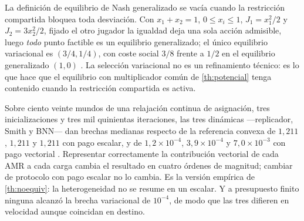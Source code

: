\begin{observacion}
\label{obs:gne-ineficiente}
La definición de equilibrio de Nash generalizado se vacía cuando la
restricción compartida bloquea toda desviación. Con $x_1+x_2=1$,
$0\le x_i\le1$, $J_1=x_1^2/2$ y $J_2=3x_2^2/2$, fijado el otro jugador la
igualdad deja una sola acción admisible, luego \emph{todo} punto factible es
un equilibrio generalizado; el único equilibrio variacional es $(3/4,1/4)$,
con coste social $3/8$ frente a $1/2$ en el equilibrio generalizado $(1,0)$
\cite{mayorga2026compendio}. La selección variacional no es un refinamiento
técnico: es lo que hace que el equilibrio con multiplicador común de
\cref{th:potencial} tenga contenido cuando la restricción compartida es
activa.
\end{observacion}

\begin{observacion}
\label{obs:pago-vectorial}
Sobre ciento veinte mundos de una relajación continua de asignación, tres
inicializaciones y tres mil quinientas iteraciones, las tres dinámicas
—replicador, Smith y BNN— dan brechas medianas respecto de la referencia
convexa de $1{,}211$, $1{,}211$ y $1{,}211$ con pago escalar, y de
$1{,}2\times10^{-4}$, $3{,}9\times10^{-4}$ y $7{,}0\times10^{-3}$ con pago
vectorial \cite{mayorga2026compendio}. Representar correctamente la
contribución vectorial de cada AMR a cada carga cambia el resultado en cuatro
órdenes de magnitud; cambiar de protocolo con pago escalar no lo cambia. Es
la versión empírica de \cref{th:noequiv}: la heterogeneidad no se resume en
un escalar. Y a presupuesto finito ninguna alcanzó la brecha variacional de
$10^{-4}$, de modo que las tres difieren en velocidad aunque coincidan en
destino.
\end{observacion}
